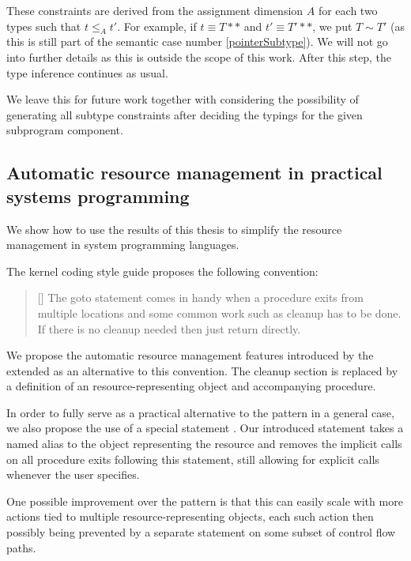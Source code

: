 These constraints are derived from the assignment dimension $A$ for each two types such that $t \leq_A t'$. For example, if $t \equiv T\ast\ast$ and $t' \equiv T'\ast\ast$, we put $T \sim T'$ (as this is still part of the semantic case number \ref{pointerSubtype}). We will not go into further details as this is outside the scope of this work. After this step, the type inference continues as usual.

We leave this for future work together with considering the possibility of generating all subtype constraints after deciding the typings for the given subprogram component.

\subsection{Automatic resource management in practical systems programming}
\label{sec:autoC}

We show how to use the results of this thesis to simplify the resource management in system programming languages.

The kernel coding style guide proposes the following convention:

\begin{quotation}[\citet{kernelStyle}]
  The goto statement comes in handy when a procedure exits from multiple locations and some common work such as cleanup has to be done. If there is no cleanup needed then just return directly.
\end{quotation}

We propose the automatic resource management features introduced by the extended \cmm as an alternative to this convention. The cleanup section is replaced by a definition of an resource-representing object and accompanying  procedure.

In order to fully serve as a practical alternative to the  pattern in a general case, we also propose the use of a special statement . Our introduced  statement takes a named alias to the object representing the resource and removes the implicit calls on all procedure exits following this statement, still allowing for explicit calls whenever the user specifies.

One possible improvement over the  pattern is that this can easily scale with more actions tied to multiple resource-representing objects, each such action then possibly being prevented by a separate  statement on some subset of control flow paths.


